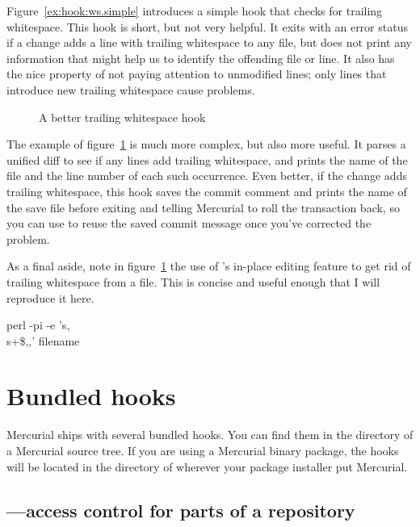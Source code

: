 Figure~\ref{ex:hook:ws.simple} introduces a simple 
hook that checks for trailing whitespace.  This hook is short, but not
very helpful.  It exits with an error status if a change adds a line
with trailing whitespace to any file, but does not print any
information that might help us to identify the offending file or
line.  It also has the nice property of not paying attention to
unmodified lines; only lines that introduce new trailing whitespace
cause problems.

\begin{figure}[ht]
  \caption{A better trailing whitespace hook}
  \label{ex:hook:ws.better}
\end{figure}

The example of figure~\ref{ex:hook:ws.better} is much more complex,
but also more useful.  It parses a unified diff to see if any lines
add trailing whitespace, and prints the name of the file and the line
number of each such occurrence.  Even better, if the change adds
trailing whitespace, this hook saves the commit comment and prints the
name of the save file before exiting and telling Mercurial to roll the
transaction back, so you can use
 to reuse the
saved commit message once you've corrected the problem.

As a final aside, note in figure~\ref{ex:hook:ws.better} the use of
's in-place editing feature to get rid of trailing
whitespace from a file.  This is concise and useful enough that I will
reproduce it here.
\begin{codesample2}
  perl -pi -e 's,\\s+\$,,' filename
\end{codesample2}

\section{Bundled hooks}

Mercurial ships with several bundled hooks.  You can find them in the
 directory of a Mercurial source tree.  If you are
using a Mercurial binary package, the hooks will be located in the
 directory of wherever your package installer put
Mercurial.

\subsection{---access control for parts of a repository}

